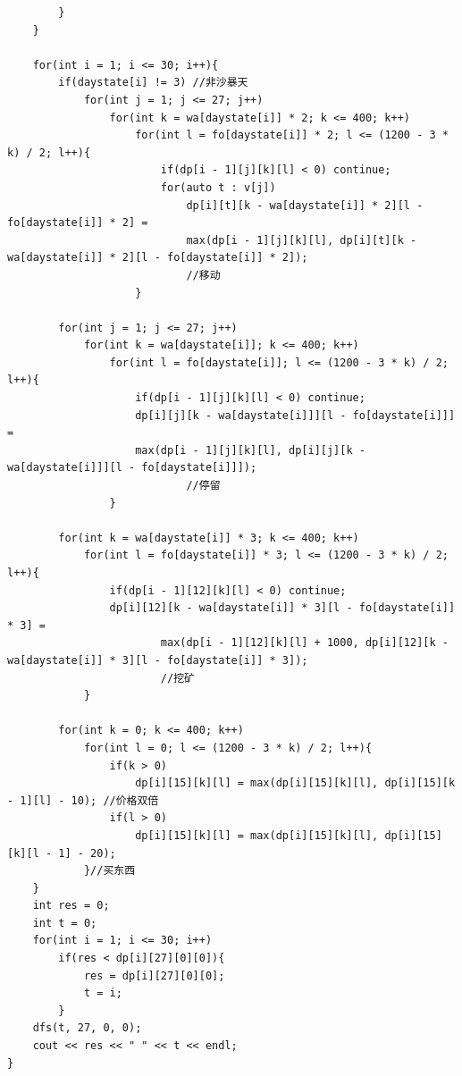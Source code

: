 \begin{verbatim}
        }
    }

    for(int i = 1; i <= 30; i++){
        if(daystate[i] != 3) //非沙暴天
            for(int j = 1; j <= 27; j++)
                for(int k = wa[daystate[i]] * 2; k <= 400; k++)   
                    for(int l = fo[daystate[i]] * 2; l <= (1200 - 3 * k) / 2; l++){
                        if(dp[i - 1][j][k][l] < 0) continue;
                        for(auto t : v[j])
                            dp[i][t][k - wa[daystate[i]] * 2][l - fo[daystate[i]] * 2] = 
                            max(dp[i - 1][j][k][l], dp[i][t][k - wa[daystate[i]] * 2][l - fo[daystate[i]] * 2]);
                            //移动
                    }
        
        for(int j = 1; j <= 27; j++)
            for(int k = wa[daystate[i]]; k <= 400; k++)   
                for(int l = fo[daystate[i]]; l <= (1200 - 3 * k) / 2; l++){
                    if(dp[i - 1][j][k][l] < 0) continue;
                    dp[i][j][k - wa[daystate[i]]][l - fo[daystate[i]]] = 
                    max(dp[i - 1][j][k][l], dp[i][j][k - wa[daystate[i]]][l - fo[daystate[i]]]);
                            //停留
                }

        for(int k = wa[daystate[i]] * 3; k <= 400; k++)   
            for(int l = fo[daystate[i]] * 3; l <= (1200 - 3 * k) / 2; l++){
                if(dp[i - 1][12][k][l] < 0) continue;
                dp[i][12][k - wa[daystate[i]] * 3][l - fo[daystate[i]] * 3] = 
                        max(dp[i - 1][12][k][l] + 1000, dp[i][12][k - wa[daystate[i]] * 3][l - fo[daystate[i]] * 3]);
                        //挖矿
            }

        for(int k = 0; k <= 400; k++)   
            for(int l = 0; l <= (1200 - 3 * k) / 2; l++){
                if(k > 0)
                    dp[i][15][k][l] = max(dp[i][15][k][l], dp[i][15][k - 1][l] - 10); //价格双倍
                if(l > 0)
                    dp[i][15][k][l] = max(dp[i][15][k][l], dp[i][15][k][l - 1] - 20);
            }//买东西
    }
    int res = 0;
    int t = 0;
    for(int i = 1; i <= 30; i++)
        if(res < dp[i][27][0][0]){
            res = dp[i][27][0][0];
            t = i;
        }
    dfs(t, 27, 0, 0);
    cout << res << " " << t << endl;
}
\end{verbatim}

